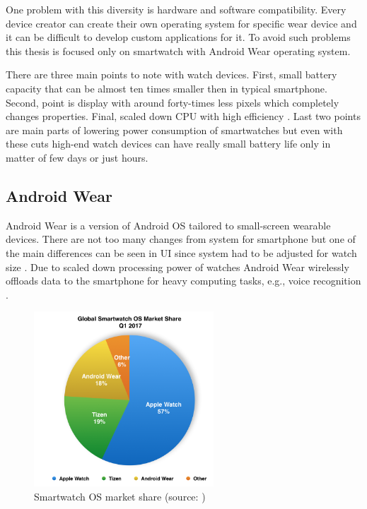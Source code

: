 One problem with this diversity is hardware and software compatibility. Every device creator can create their own operating system for specific wear device and it can be difficult to develop custom applications for it. To avoid such problems this thesis is focused only on smartwatch with Android Wear operating system. 

There are three main points to note with watch devices. First, small battery capacity that can be almost ten times smaller then in typical smartphone. Second, point is display with around forty-times less pixels which completely changes properties. Final, scaled down CPU with high efficiency \cite{UtCoAWO}. Last two points are main parts of lowering power consumption of smartwatches but even with these cuts high-end watch devices can have really small battery life only in matter of few days or just hours.

\subsection{Android Wear}\label{sec:AndroidWear}
Android Wear is a version of Android OS tailored to small-screen wearable devices. There are not too many changes from system for smartphone but one of the main differences can be seen in UI since system had to be adjusted for watch size \cite{CSUITW}. Due to scaled down processing power of watches Android Wear wirelessly offloads data to the smartphone for heavy computing tasks, e.g., voice recognition \cite{UCAW}.

\begin{figure}[H]
	\begin{centering}
		\includegraphics[width=0.6\textwidth]{img/wear_market_share}
		\par\end{centering}
	\caption{Smartwatch OS market share (source: \cite{TOAW})\label{fig:SmartwatchOSMarketShare}}
	\label{fig02c04}
\end{figure}

